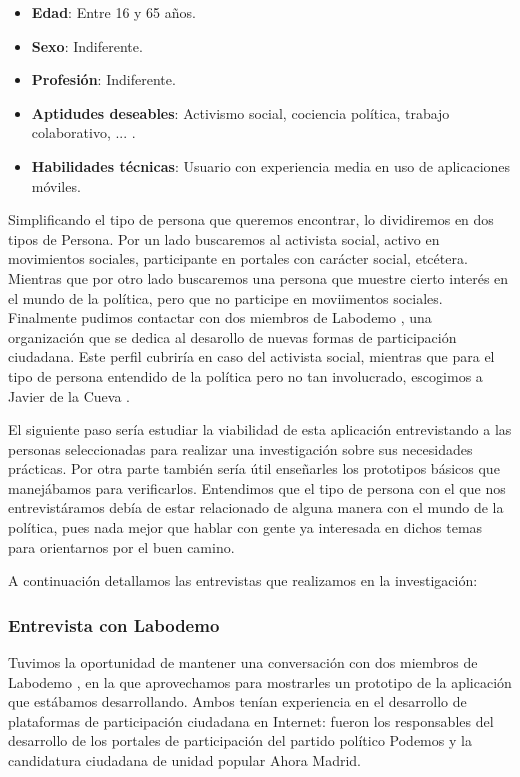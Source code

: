 \begin{itemize}
\item \textbf{Edad}: Entre 16 y 65 años.
\item \textbf{Sexo}: Indiferente.
\item \textbf{Profesión}: Indiferente.
\item \textbf{Aptidudes deseables}: Activismo social, cociencia política, trabajo colaborativo, ... .
\item \textbf{Habilidades técnicas}: Usuario con experiencia media en uso de aplicaciones móviles.
\end{itemize}

Simplificando el tipo de persona que queremos encontrar, lo dividiremos en dos tipos de Persona. Por un lado buscaremos al activista social, activo en movimientos sociales, participante en portales con carácter social, etcétera. Mientras que por otro lado buscaremos una persona que muestre cierto interés en el mundo de la política, pero que no participe en moviimentos sociales. Finalmente pudimos contactar con dos miembros de Labodemo \cite{ref:labodemo}, una organización que se dedica al desarollo de nuevas formas de participación ciudadana. Este perfil cubriría en caso del activista social, mientras que para el tipo de persona entendido de la política pero no tan involucrado, escogimos a Javier de la Cueva \cite{ref:jdelacueva}.

El siguiente paso sería estudiar la viabilidad de esta aplicación entrevistando a las personas seleccionadas para realizar una investigación sobre sus necesidades prácticas. Por otra parte también sería útil enseñarles los prototipos básicos que manejábamos para verificarlos. Entendimos que el tipo de persona con el que nos entrevistáramos debía de estar relacionado de alguna manera con el mundo de la política, pues nada mejor que hablar con gente ya interesada en dichos temas para orientarnos por el buen camino.

A continuación detallamos las entrevistas que realizamos en la investigación:

\subsubsection{Entrevista con Labodemo}

Tuvimos la oportunidad de mantener una conversación con dos miembros de Labodemo \cite{ref:labodemo}, en la que aprovechamos para mostrarles un prototipo de la aplicación que estábamos desarrollando. Ambos tenían experiencia en el desarrollo de plataformas de participación ciudadana en Internet: fueron los responsables del desarrollo de los portales de participación del partido político Podemos y la candidatura ciudadana de unidad popular Ahora Madrid.


